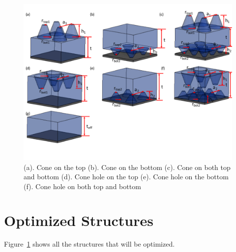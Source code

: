 \documentclass[12pt]{article}
\date{\today }
\author{
Paul W. Leu\\
University of Pittsburgh\\
Pittsburgh, PA}
\numberwithin{equation}{section}
\numberwithin{equation}{section}
\begin{document}
\tableofcontents

\begin{figure}[H]
\centering
\includegraphics[scale=0.4]{../Figures/Schematic}
\caption{(a). Cone on the top (b). Cone on the bottom (c). Cone on  both top and bottom (d). Cone hole on the top (e). Cone hole on the bottom (f). Cone hole on both top and bottom}
\label{fig:Schematic}
\vspace{0pt}
\end{figure}
 
\section{Optimized Structures}
Figure~\ref{fig:Schematic} shows all the structures that will be optimized. \\ 
\end{document}
